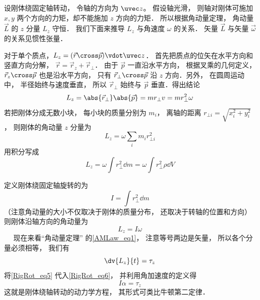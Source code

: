 设刚体绕固定轴转动， 令轴的方向为 $\uvec z$。 假设轴光滑， 则轴对刚体可施加 $x, y$ 两个方向的力矩，却不能施加 $z$ 方向的力矩． 所以根据角动量定理， 角动量 $\vec L$ 的 $z$ 分量 $L_z$ 守恒． 我们下面来推导 $L_z$ 与角速度 $\omega$ 的关系． 矢量 $\vec L$ 与矢量 $\vec \omega$ 的关系见惯性张量．

对于单个质点，$L_z = ( \vec r \cross \vec p ) \vdot \uvec z$． 首先把质点的位矢在水平方向和竖直方向分解， $\vec r = \vec r_z + \vec r_ \bot$． 由于 $\vec p$ 一直沿水平方向， 根据叉乘的几何定义， $\vec r_z \cross \vec p$ 也是沿水平方向， 只有 $\vec r_ \bot \cross \vec p$ 沿 $z$ 方向．另外， 在圆周运动中， 半径始终与速度垂直， 所以 $\vec r_ \bot$ 始终与 $\vec p$ 垂直．得出结论
\begin{equation}
L_z = \abs{\vec r_\bot} \abs{\vec p} = m r_ \bot v = mr_ \bot ^2\omega 
\end{equation}
若把刚体分成无数小块， 每小块的质量分别为 $m_i$， 离轴的距离 $r_{\bot i} = \sqrt{x_i^2 + y_i^2} $， 则刚体的角动量 $z$ 分量为
\begin{equation}
L_z = \omega \sum_i m_i r_{ \bot i}^2
\end{equation}
用积分写成
\begin{equation}
L_z = \omega \int r_ \bot ^2 \dd{m} = \omega \int r_ \bot ^2\rho  \dd{V} 
\end{equation}

定义刚体绕固定轴旋转的为
\begin{equation}
I = \int r_ \bot ^2 \dd{m} 
\end{equation}
（注意角动量的大小不仅取决于刚体的质量分布， 还取决于转轴的位置和方向）则刚体沿轴方向的角动量为
\begin{equation}\label{RigRot_eq5}
L_z = I\omega 
\end{equation}
 
现在来看“角动量定理” 的\autoref{AMLaw_eq1}， 注意等号两边是矢量， 所以各个分量必须相等， 我们有
\begin{equation}\label{RigRot_eq6}
\dv{L_z}{t} = \tau_z
\end{equation}
将\autoref{RigRot_eq5} 代入\autoref{RigRot_eq6}， 并利用角加速度的定义得
\begin{equation}\label{RigRot_eq7}
I\alpha = \tau_z
\end{equation}
这就是刚体绕轴转动的动力学方程， 其形式可类比牛顿第二定律．

